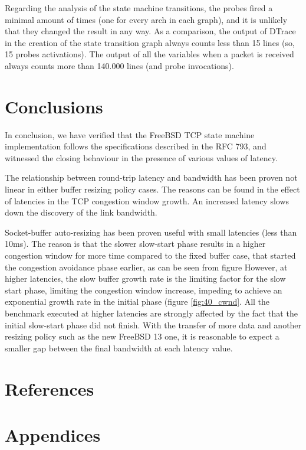 \documentclass[a4paper,10pt]{article}
\begin{document}
Regarding the analysis of the state machine transitions, the probes fired a minimal amount of times (one for every arch in each graph), and it is unlikely that they changed the result in any way. As a comparison, the output of DTrace in the creation of the state transition graph always counts less than 15 lines (so, 15 probes activations). The output of all the variables when a packet is received always counts more than 140.000 lines (and probe invocations).


\section{Conclusions}

In conclusion, we have verified that the FreeBSD TCP state machine implementation follows the specifications described in the RFC 793\cite{RFC793}, and witnessed the closing behaviour in the presence of various values of latency.

The relationship between round-trip latency and bandwidth has been proven not linear in either buffer resizing policy cases. The reasons can be found in the effect of latencies in the TCP congestion window growth. An increased latency slows down the discovery of the link bandwidth. 

Socket-buffer auto-resizing has been proven useful with small latencies (less than 10ms). The reason is that the slower slow-start phase results in a higher congestion window for more time compared to the fixed buffer case, that started the congestion avoidance phase earlier, as can be seen from figure %
However,  at higher latencies, the slow buffer growth rate is the limiting factor for the slow start phase, limiting the congestion window increase, impeding to achieve an exponential growth rate in the initial phase (figure \ref{fig:40_cwnd}.  
All the benchmark executed at higher latencies are strongly affected by the fact that the initial slow-start phase did not finish. With the transfer of more data and another resizing policy such as the new FreeBSD 13 one, it is reasonable to expect a smaller gap between the final bandwidth at each latency value.

\newpage

\section{References}

\printbibliography

\section{Appendices}
\end{document}
